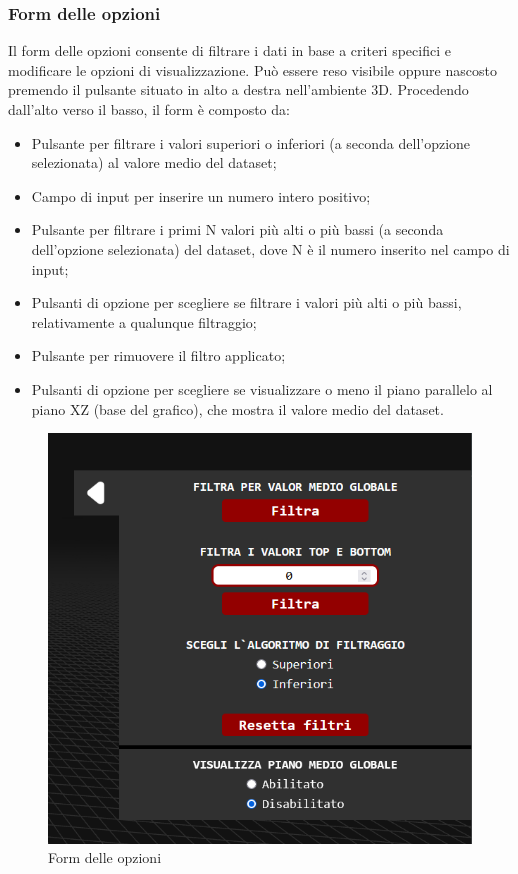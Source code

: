 \subsubsection{Form delle opzioni}
Il form delle opzioni consente di filtrare i dati in base a criteri specifici e
modificare le opzioni di visualizzazione. Può essere reso visibile oppure
nascosto premendo il pulsante situato in alto a destra nell'ambiente 3D.
Procedendo dall'alto verso il basso, il form è composto da:
\begin{itemize}
    \item Pulsante per filtrare i valori superiori o inferiori (a seconda dell'opzione
          selezionata) al valore medio del dataset;
    \item Campo di input per inserire un numero intero positivo;
    \item Pulsante per filtrare i primi N valori più alti o più bassi (a seconda
          dell'opzione selezionata) del dataset, dove N è il numero inserito nel campo di
          input;
    \item Pulsanti di opzione per scegliere se filtrare i valori più alti o più bassi,
          relativamente a qualunque filtraggio;
    \item Pulsante per rimuovere il filtro applicato;
    \item Pulsanti di opzione per scegliere se visualizzare o meno il piano parallelo al
          piano XZ (base del grafico), che mostra il valore medio del dataset.
\end{itemize}
\begin{figure}[ht!]
    \centering
    \includegraphics[scale=0.6]{template/images/options.png}
    \caption{Form delle opzioni}
\end{figure}

